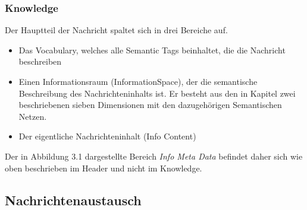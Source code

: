 \subsubsection{Knowledge}
Der Hauptteil der Nachricht spaltet sich in drei Bereiche auf.
\begin{itemize}
	\item Das Vocabulary, welches alle Semantic Tags beinhaltet, die die Nachricht beschreiben
	\item Einen Informationsraum (InformationSpace), der die semantische Beschreibung des Nachrichteninhalts ist. Er besteht aus den in Kapitel zwei beschriebenen sieben Dimensionen mit den dazugehörigen Semantischen Netzen.
	\item Der eigentliche Nachrichteninhalt (Info Content)	
\end{itemize}
Der in Abbildung 3.1 dargestellte Bereich \textit{Info Meta Data} befindet daher sich wie oben beschrieben im Header und nicht im Knowledge.
\subsection{Nachrichtenaustausch}
